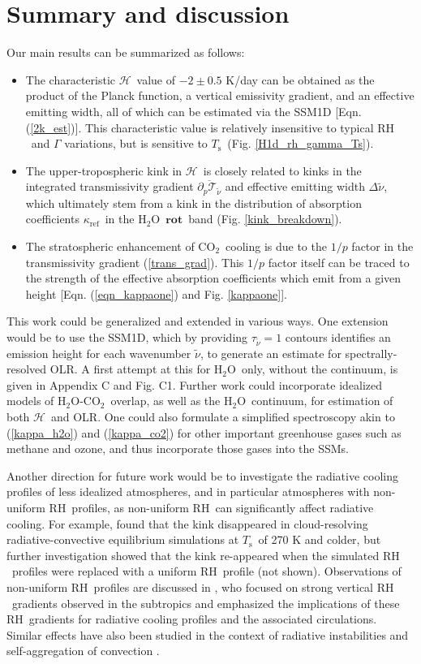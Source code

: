 \documentclass{ametsoc}
\newcommand{\eqnref}[1]{(\ref{#1})}
\newcommand{\ppp}{\ensuremath{\partial_p}}
\newcommand{\Ts}{\ensuremath{T_\mathrm{s}}}
\newcommand{\cotwo}{\ensuremath{\mathrm{CO_2}}}
\newcommand{\htwo}{\ensuremath{\mathrm{H_2O}}}
\newcommand{\RH}{\ensuremath{\mathrm{RH}}}
\newcommand{\wv}{\ensuremath{\widetilde{\nu}}}
\newcommand{\trans}{\ensuremath{\mathcal{T}}}
\newcommand{\ch}{\ensuremath{\mathcal{H}}}
\newcommand{\tauk}{\ensuremath{\tau_{\wv}}}
\newcommand{\kapparef}{\ensuremath{\kappa_{\mathrm{ref}}}}
\newcommand{\rot}{\ensuremath{\textbf{rot}}}
\begin{document}
\section{Summary and discussion} \label{sec_summary}
Our main results can be summarized as follows:
\begin{itemize}
	\item The characteristic \ch\ value of  $-2 \pm 0.5$ K/day can be obtained as the product of the Planck function, a vertical emissivity gradient, and an effective emitting width, all of which can be estimated via the SSM1D [Eqn. \eqnref{2k_est}]. This characteristic value is relatively insensitive to typical \RH\ and $\Gamma$ variations, but is sensitive to \Ts\ (Fig. \ref{H1d_rh_gamma_Ts}).
	\item  The upper-tropospheric kink in \ch\  is closely related to kinks in the integrated transmissivity gradient $\overline{\ppp \trans_{\wv}}$ and effective emitting width $\Delta \wv$, which ultimately stem from a kink in the distribution of absorption coefficients \kapparef\ in the \htwo\ \rot\ band (Fig. \ref{kink_breakdown}). 
	\item The stratospheric enhancement of \cotwo\ cooling is due to the $1/p$ factor in the transmissivity gradient \eqnref{trans_grad}. This $1/p$ factor itself can be traced to the strength of the effective absorption coefficients which emit from a given height [Eqn. \eqnref{eqn_kappaone} and Fig. \ref{kappaone}].		
\end{itemize}

This work could be generalized and extended in various ways. One extension would be to use the SSM1D, which by providing $\tauk=1$ contours identifies an emission height for each wavenumber \wv, to generate an estimate for spectrally-resolved OLR. A first attempt at this for \htwo\ only, without the continuum, is given in Appendix C and Fig. C1. Further work could incorporate idealized models of  \htwo-\cotwo\ overlap, as well as the \htwo\ continuum, for estimation of both \ch\ and OLR. One could also formulate a simplified spectroscopy akin to \eqnref{kappa_h2o} and \eqnref{kappa_co2}  for other important greenhouse gases such as methane and ozone, and thus incorporate those gases into the SSMs.

Another direction for future work would be to investigate the radiative cooling profiles of less idealized atmospheres, and in particular atmospheres with non-uniform \RH\ profiles, as non-uniform \RH\   can significantly affect radiative cooling. For example,  \cite{seeley2019b} found that the kink disappeared in cloud-resolving radiative-convective equilibrium simulations at \Ts\ of 270 K and colder, but further investigation showed that the kink re-appeared when the simulated \RH\ profiles were replaced with a uniform \RH\ profile (not shown). Observations of non-uniform \RH\ profiles are discussed in \cite{stevens2017},  who focused on strong vertical \RH\ gradients observed in the subtropics and   emphasized  the implications of these \RH\ gradients for radiative cooling profiles and the  associated circulations. Similar effects have also been studied in the context of radiative instabilities and self-aggregation of convection \citep{beucler2018,beucler2016,emanuel2014}. 
\end{document}
